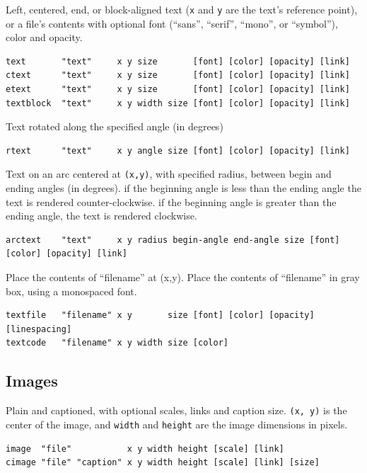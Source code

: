 Left, centered, end, or block-aligned text (\texttt{x} and \texttt{y}
are the text's reference point), or a file's contents with optional font
(``sans'', ``serif'', ``mono'', or ``symbol''), color and opacity.

\begin{verbatim}
text       "text"     x y size       [font] [color] [opacity] [link]
ctext      "text"     x y size       [font] [color] [opacity] [link]
etext      "text"     x y size       [font] [color] [opacity] [link]
textblock  "text"     x y width size [font] [color] [opacity] [link]
\end{verbatim}

Text rotated along the specified angle (in degrees)

\begin{verbatim}
rtext      "text"     x y angle size [font] [color] [opacity] [link]
\end{verbatim}

Text on an arc centered at \texttt{(x,y)}, with specified radius,
between begin and ending angles (in degrees). if the beginning angle is
less than the ending angle the text is rendered counter-clockwise. if
the beginning angle is greater than the ending angle, the text is
rendered clockwise.

\begin{verbatim}
arctext    "text"     x y radius begin-angle end-angle size [font] [color] [opacity] [link]
\end{verbatim}

Place the contents of ``filename'' at (x,y). Place the contents of
``filename'' in gray box, using a monospaced font.

\begin{verbatim}
textfile   "filename" x y       size [font] [color] [opacity] [linespacing]
textcode   "filename" x y width size [color]
\end{verbatim}

\hypertarget{images}{%
\subsection{Images}\label{images}}

Plain and captioned, with optional scales, links and caption size.
\texttt{(x,\ y)} is the center of the image, and \texttt{width} and
\texttt{height} are the image dimensions in pixels.

\begin{verbatim}
image  "file"           x y width height [scale] [link]
cimage "file" "caption" x y width height [scale] [link] [size]
\end{verbatim}

